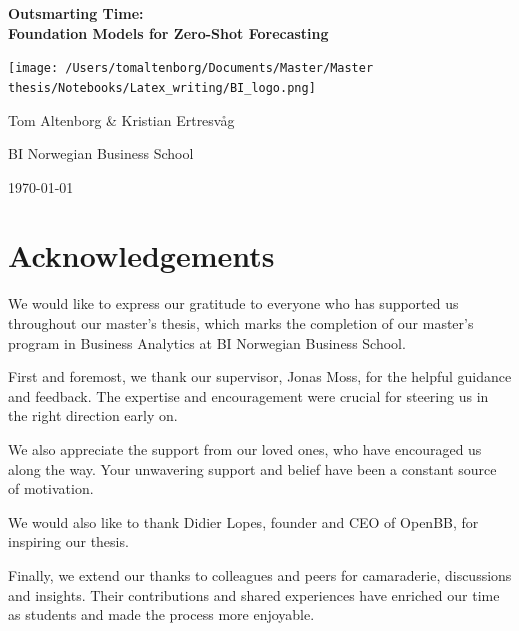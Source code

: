 \documentclass[12pt,a4paper]{article}
\begin{document}
\begin{titlepage}
  \centering
  \vspace*{1cm} %
 {\LARGE \bfseries Outsmarting Time: \\[0.5em] %
 \huge{Foundation Models for Zero-Shot Forecasting}\par} %

  \texttt{[image: /Users/tomaltenborg/Documents/Master/Master thesis/Notebooks/Latex\_writing/BI\_logo.png]} %

  \vspace{1.5cm}
  {\large Tom Altenborg \& Kristian Ertresvåg\par} %
  \vspace{0.5cm}
  {\large BI Norwegian Business School\par} %
  \vspace{1cm}
  {\large \today\par} %
  \vspace{2cm} %
\end{titlepage}
\section*{Acknowledgements}
We would like to express our gratitude to everyone who has supported us throughout our master’s thesis, which marks the completion of our master’s program in Business Analytics at BI Norwegian Business School.

First and foremost, we thank our supervisor, Jonas Moss, for the helpful guidance and feedback. The expertise and encouragement were crucial for steering us in the right direction early on. 

We also appreciate the support from our loved ones, who have encouraged us along the way. Your unwavering support and belief have been a constant source of motivation.

We would also like to thank Didier Lopes, founder and CEO of OpenBB, for inspiring our thesis.  

Finally, we extend our thanks to colleagues and peers for camaraderie, discussions and insights. Their contributions and shared experiences have enriched our time as students and made the process more enjoyable.
\end{document}
